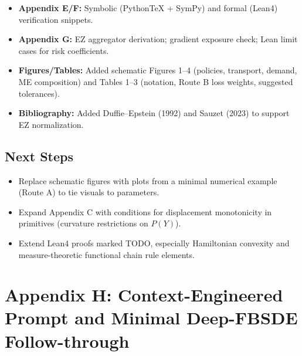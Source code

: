 ﻿\documentclass[11pt,letterpaper,oneside]{article}
\numberwithin{equation}{section}
\newcommand{\1}{\mathbf{1}}
\begin{document}
\begin{itemize}[leftmargin=1.15em,itemsep=0.25em]
  \item \textbf{Appendix E/F:} Symbolic (PythonTeX + SymPy) and formal (Lean4) verification snippets.
  \item \textbf{Appendix G:} EZ aggregator derivation; gradient exposure check; Lean limit cases for risk coefficients.
  \item \textbf{Figures/Tables:} Added schematic Figures 1–4 (policies, transport, demand, ME composition) and Tables 1–3 (notation, Route B loss weights, suggested tolerances).
  \item \textbf{Bibliography:} Added Duffie–Epstein (1992) and Sauzet (2023) to support EZ normalization.
\end{itemize}

\subsection*{Next Steps}
\begin{itemize}[leftmargin=1.15em,itemsep=0.25em]
  \item Replace schematic figures with plots from a minimal numerical example (Route A) to tie visuals to parameters.
  \item Expand Appendix C with conditions for displacement monotonicity in primitives (curvature restrictions on $P(Y)$).
  \item Extend Lean4 proofs marked TODO, especially Hamiltonian convexity and measure-theoretic functional chain rule elements.
\end{itemize}


\section*{Appendix H: Context-Engineered Prompt and Minimal Deep-FBSDE Follow-through}
\end{document}
